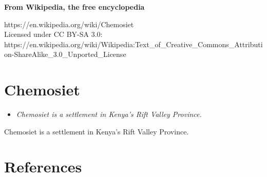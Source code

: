 \textbf{From Wikipedia, the free encyclopedia}

https://en.wikipedia.org/wiki/Chemosiet\\
Licensed under CC BY-SA 3.0:\\
https://en.wikipedia.org/wiki/Wikipedia:Text\_of\_Creative\_Commons\_Attribution-ShareAlike\_3.0\_Unported\_License

\section{Chemosiet}\label{chemosiet}

\begin{itemize}
\item
  \emph{Chemosiet is a settlement in Kenya's Rift Valley Province.}
\end{itemize}

Chemosiet is a settlement in Kenya's Rift Valley Province.

\section{References}\label{references}
